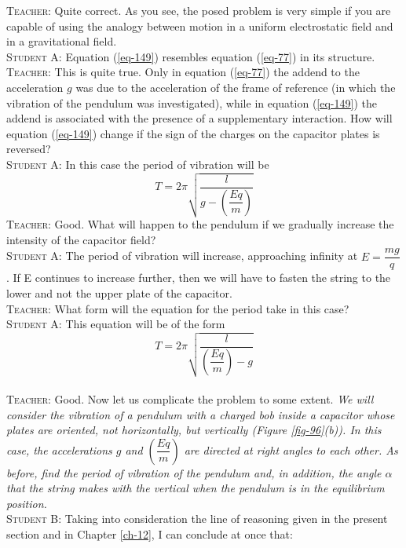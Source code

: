\documentclass[a4paper,sfsidenotes]{tufte-book}
\begin{document}
\textsc{Teacher:} Quite correct. As you see, the posed problem is very simple if you are capable of using the analogy between motion in a uniform electrostatic field and in a gravitational field.
\\
\textsc{Student A:} Equation (\ref{eq-149}) resembles equation (\ref{eq-77}) in its structure.
\\
\textsc{Teacher:} This is quite true. Only in equation (\ref{eq-77}) the addend to the acceleration $g$ was due to the acceleration of the frame of reference (in which the vibration of the pendulum was investigated), while in equation (\ref{eq-149}) the addend is associated with the presence of a supplementary interaction. How will equation (\ref{eq-149}) change if the sign of the charges on the capacitor plates is reversed?
\\
\textsc{Student A:} In this case the period of vibration will be
\begin{equation}%
T = 2 \pi \sqrt{\dfrac{l}{ g- \left(\dfrac{Eq}{m} \right)}}
\label{eq-150}
\end{equation}
\textsc{Teacher:} Good. What will happen to the pendulum if we gradually increase the intensity of the capacitor field?
\\
\textsc{Student A:} The period of vibration will increase, approaching infinity at $E=\dfrac{mg}{q}$. If E continues to increase further, then we will have to fasten the string to the lower and not the upper plate of the capacitor.
\\
\textsc{Teacher:} What form will the equation for the period take in this case?
\\
\textsc{Student A:} This equation will be of the form
\begin{equation}%
T = 2 \pi \sqrt{\dfrac{l}{ \left(\dfrac{Eq}{m} \right) - g}}
\label{eq-151}
\end{equation}
\\
\textsc{Teacher:} Good. Now let us complicate the problem to some extent. \emph{We will consider the vibration of a pendulum with a charged bob inside a capacitor whose plates are oriented, not horizontally, but vertically (\emph{Figure \ref{fig-96}(b)}). In this case, the accelerations $g$ and $\left( \dfrac{Eq}{m} \right)$ are directed at right angles to each other. As before, find the period of vibration of the pendulum and, in addition, the angle $\alpha$ that the string makes with the vertical when the pendulum is in the equilibrium position.}
\\
\textsc{Student B:} Taking into consideration the line of reasoning given in the present section and in  Chapter \ref{ch-12}, I can conclude at once that: 
\end{document}
